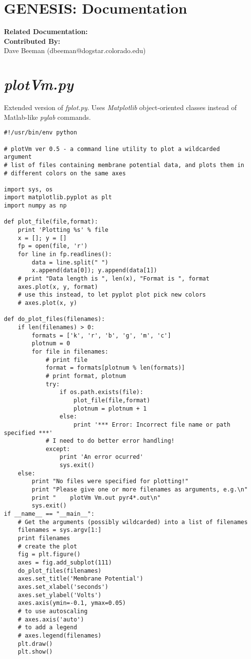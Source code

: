 \documentclass[12pt]{article}
\begin{document}
\section*{GENESIS: Documentation}

{\bf Related Documentation:}
{\\\bf Contributed By:}\\
Dave Beeman (dbeeman@dogstar.colorado.edu)\\

\section*{\it plotVm.py}

Extended version of {\it fplot.py}. Uses {\it Matplotlib}
object-oriented classes instead of Matlab-like {\it pylab} commands. 

\begin{verbatim}
#!/usr/bin/env python

# plotVm ver 0.5 - a command line utility to plot a wildcarded argument
# list of files containing membrane potential data, and plots them in
# different colors on the same axes

import sys, os
import matplotlib.pyplot as plt
import numpy as np

def plot_file(file,format):
    print 'Plotting %s' % file
    x = []; y = []
    fp = open(file, 'r')
    for line in fp.readlines():
        data = line.split(" ")
        x.append(data[0]); y.append(data[1])
    # print "Data length is ", len(x), "Format is ", format
    axes.plot(x, y, format)
    # use this instead, to let pyplot plot pick new colors
    # axes.plot(x, y)

def do_plot_files(filenames):
    if len(filenames) > 0:
        formats = ['k', 'r', 'b', 'g', 'm', 'c']
        plotnum = 0
        for file in filenames:
            # print file
            format = formats[plotnum % len(formats)]
            # print format, plotnum
            try:
                if os.path.exists(file):
                    plot_file(file,format)
                    plotnum = plotnum + 1
                else:
                    print '*** Error: Incorrect file name or path specified ***'
            # I need to do better error handling!
            except:
                print 'An error ocurred'
                sys.exit()
    else:
        print "No files were specified for plotting!"
        print "Please give one or more filenames as arguments, e.g.\n"
        print "    plotVm Vm.out pyr4*.out\n"
        sys.exit()   
if __name__ == "__main__":
    # Get the arguments (possibly wildcarded) into a list of filenames
    filenames = sys.argv[1:]
    print filenames
    # create the plot
    fig = plt.figure()
    axes = fig.add_subplot(111)
    do_plot_files(filenames)
    axes.set_title('Membrane Potential')
    axes.set_xlabel('seconds')
    axes.set_ylabel('Volts')
    axes.axis(ymin=-0.1, ymax=0.05)
    # to use autoscaling
    # axes.axis('auto')
    # to add a legend
    # axes.legend(filenames)
    plt.draw()
    plt.show()
\end{verbatim}
\end{document}
